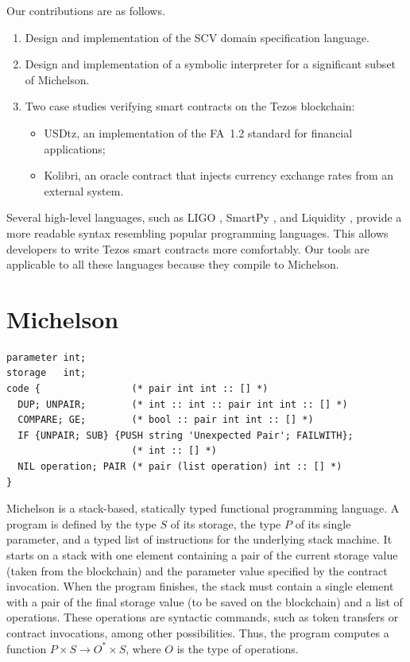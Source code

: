 \documentclass[runningheads]{llncs}
\begin{document}
Our contributions are as follows.
\begin{enumerate}
\item Design and implementation of the SCV domain specification language.
\item Design and implementation of a symbolic interpreter for a significant subset of Michelson. 
\item Two case studies verifying smart contracts on the Tezos blockchain:
  \begin{itemize}
  \item USDtz, an implementation of the FA~1.2 standard for financial applications;
  \item Kolibri, an oracle contract that injects currency exchange rates from an external system.
  \end{itemize}
\end{enumerate}

Several high-level languages, such as LIGO \cite{ligo}, SmartPy \cite{smartpy}, and Liquidity \cite{liquidity}, provide a more readable syntax resembling popular programming languages. This allows developers to write Tezos smart contracts more comfortably. Our tools are applicable to all these languages because they compile to Michelson.
\section{Michelson}
\label{sec:background}
\lstset{language=michelson}
\begin{lstlisting}[float=tp,captionpos=b,caption={A Michelson program},label={lst:simple-program-add}]
parameter int;
storage   int;
code {                (* pair int int :: [] *)
  DUP; UNPAIR;        (* int :: int :: pair int int :: [] *) 
  COMPARE; GE;        (* bool :: pair int int :: [] *)
  IF {UNPAIR; SUB} {PUSH string 'Unexpected Pair'; FAILWITH};
                      (* int :: [] *)
  NIL operation; PAIR (* pair (list operation) int :: [] *)
}
\end{lstlisting}
Michelson is a stack-based, statically typed functional programming language. A program is defined by the type $S$ of its storage, the type $P$ of its single parameter, and a typed list of instructions for the underlying stack machine. It starts on a stack with one element containing a pair of the current storage value (taken from the blockchain) and the parameter value specified by the contract invocation. When the program finishes, the stack must contain a single element with a pair of the final storage value (to be saved on the blockchain) and a list of operations. These operations are syntactic commands, such as token transfers or contract invocations, among other possibilities. Thus, the program computes a function $P \times S \to O^* \times S$, where $O$ is the type of operations.
\end{document}
